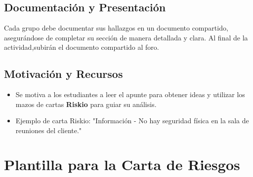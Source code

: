 \subsection{Documentación y Presentación}

Cada grupo debe documentar sus hallazgos en un documento compartido, asegurándose de completar su sección de manera detallada y clara. Al final de la actividad,subirán el documento compartido al foro.

\subsection{Motivación y Recursos}

\begin{itemize}
  \item Se motiva a los estudiantes a leer el apunte para obtener ideas y utilizar los mazos de cartas \textbf{Riskio} para guiar su análisis.
  \item Ejemplo de carta Riskio: "Información - No hay seguridad física en la sala de reuniones del cliente."
\end{itemize}

\section{Plantilla para la Carta de Riesgos}

